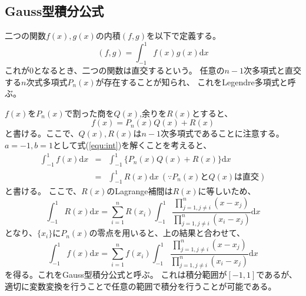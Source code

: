 \documentclass[a4j, titlepage]{jsarticle}
\numberwithin{equation}{section}
\begin{document}
    \subsection{Gauss型積分公式}
        二つの関数$f(x),g(x)$の内積$(f,g)$を以下で定義する。
        \begin{equation*}
            (f,g)=\int_{-1}^1f(x)g(x)\mathrm{d}x
        \end{equation*}
        これが0となるとき、二つの関数は直交するという。
        任意の$n-1$次多項式と直交する$n$次式多項式$P_n(x)$が存在することが知られ、
        これをLegendre多項式と呼ぶ。

        $f(x)$を$P_n(x)$で割った商を$Q(x)$,余りを$R(x)$とすると、
        \begin{equation*}
            f(x) = P_n(x)Q(x)+R(x)
        \end{equation*}
        と書ける。ここで、$Q(x),R(x)$は$n-1$次多項式であることに注意する。
        $a=-1,b=1$として式(\ref{equ:int})を解くことを考えると、
        \begin{eqnarray*}
            \int_{-1}^1f(x)\mathrm{d}x &=& \int_{-1}^1\{P_n(x)Q(x)+R(x)\}\mathrm{d}x \\
            &=& \int_{-1}^1R(x)\mathrm{d}x \ (\because P_n(x)とQ(x)は直交)
        \end{eqnarray*}
        と書ける。
        ここで、$R(x)$のLagrange補間は$R(x)$に等しいため、
        \begin{equation*}
            \int_{-1}^1R(x)\mathrm{d}x = \sum_{i=1}^nR(x_i)\int_{-1}^1\frac{\displaystyle\prod_{j=1,j\neq i}^n (x-x_j)}{\displaystyle\prod_{j=1,j\neq i}^n (x_i-x_j)}\mathrm{d}x
        \end{equation*}
        となり、$\{x_i\}$に$P_n(x)$の零点を用いると、上の結果と合わせて、
        \begin{equation*}
            \int_{-1}^1f(x)\mathrm{d}x = \sum_{i=1}^nf(x_i)\int_{-1}^1\frac{\displaystyle\prod_{j=1,j\neq i}^n (x-x_j)}{\displaystyle\prod_{j=1,j\neq i}^n (x_i-x_j)}\mathrm{d}x
        \end{equation*}
        を得る。これをGauss型積分公式と呼ぶ。
        これは積分範囲が$[-1,1]$であるが、
        適切に変数変換を行うことで任意の範囲で積分を行うことが可能である。
\end{document}
